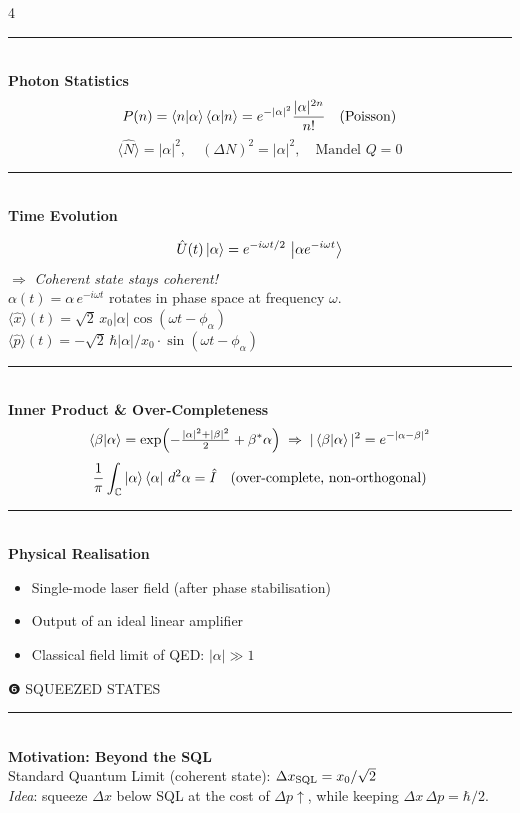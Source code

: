 \documentclass[9pt,landscape]{article}
\newcommand{\N}{\hat{N}}
\newcommand{\x}{\hat{x}}
\newcommand{\p}{\hat{p}}
\newcommand{\xz}{x_0}                     %
\newcommand{\mysec}[1]{%
  \vspace{3pt}%
  {\color{midviolet}\rule{\linewidth}{0.6pt}}\\[-1pt]%
  {\bfseries\color{deepviolet}\small #1}\\[0.5pt]%
}
\begin{document}
\begin{multicols}{4}
\mysec{Photon Statistics}
\[
  P(n)=\bra{n}\ket{\alpha}\bra{\alpha}\ket{n}
      = e^{-|\alpha|^2}\frac{|\alpha|^{2n}}{n!}\quad\text{(Poisson)}
\]
\[
  \langle\N\rangle = |\alpha|^2,\quad
  (\Delta N)^2 = |\alpha|^2,\quad
  \text{Mandel }Q = 0
\]

\mysec{Time Evolution}
\begin{tcolorbox}[greenbox]
\[
  \hat{U}(t)\ket{\alpha} = e^{-i\omega t/2}\,\ket{\alpha e^{-i\omega t}}
\]
$\Rightarrow$ \emph{Coherent state stays coherent!}\\
$\alpha(t) = \alpha\,e^{-i\omega t}$ rotates in phase space at frequency $\omega$.\\[2pt]
$\langle\x\rangle(t) = \sqrt{2}\,\xz|\alpha|\cos(\omega t-\phi_\alpha)$\\
$\langle\p\rangle(t) = -\sqrt{2}\,\hbar|\alpha|/\xz\cdot\sin(\omega t-\phi_\alpha)$
\end{tcolorbox}

\mysec{Inner Product \& Over-Completeness}
\[
  \braket{\beta}{\alpha} = \exp\!\left(-\tfrac{|\alpha|^2+|\beta|^2}{2}+\beta^*\alpha\right)
  \;\Rightarrow\;
  |\braket{\beta}{\alpha}|^2 = e^{-|\alpha-\beta|^2}
\]
\[
  \frac{1}{\pi}\int_{\mathbb{C}}\ket{\alpha}\bra{\alpha}\,d^2\alpha = \hat{I}
  \quad\text{(over-complete, non-orthogonal)}
\]

\mysec{Physical Realisation}
\begin{itemize}[leftmargin=*, itemsep=0pt, topsep=0pt]
  \item Single-mode laser field (after phase stabilisation)
  \item Output of an ideal linear amplifier
  \item Classical field limit of QED: $|\alpha|\gg 1$
\end{itemize}


\begin{tcolorbox}[sectionbox]
  \centering ❻\; SQUEEZED STATES
\end{tcolorbox}

\mysec{Motivation: Beyond the SQL}
Standard Quantum Limit (coherent state): $\Delta x_{\rm SQL}=\xz/\sqrt{2}$\\
\emph{Idea}: squeeze $\Delta x$ below SQL at the cost of $\Delta p\uparrow$, while keeping $\Delta x\,\Delta p=\hbar/2$.


\end{multicols}
\end{document}
